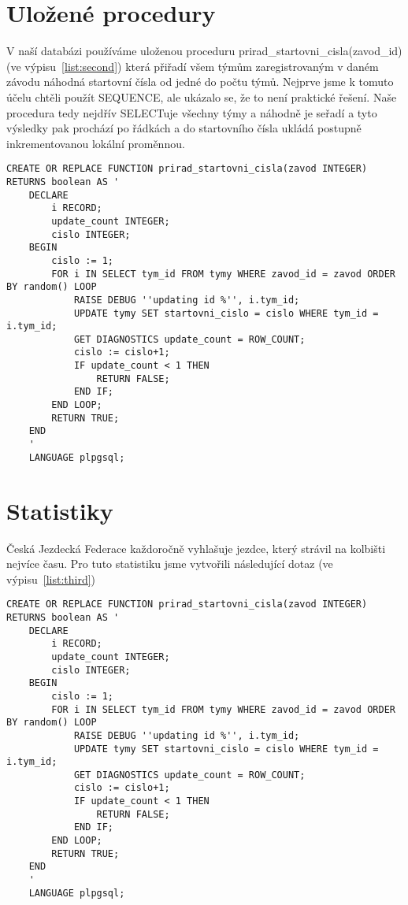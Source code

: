 \documentclass[a4paper,11pt]{article}
\theoremstyle{mytheor}
\begin{document}
\section*{Uložené procedury}
V naší databázi používáme uloženou proceduru prirad\_startovni\_cisla(zavod\_id) (ve výpisu~\ref{list:second}) která přiřadí všem týmům zaregistrovaným v daném závodu náhodná startovní čísla
od jedné do počtu týmů. Nejprve jsme k tomuto účelu chtěli použít SEQUENCE, ale ukázalo se, že to není praktické řešení. Naše procedura tedy nejdřív SELECTuje
všechny týmy a náhodně je seřadí a tyto výsledky pak prochází po řádkách a do startovního čísla ukládá postupně inkrementovanou lokální proměnnou.


\begin{lstlisting}[label={list:second},caption=Uložená procedura prirad\_startovni\_cisla\(\)]
CREATE OR REPLACE FUNCTION prirad_startovni_cisla(zavod INTEGER) RETURNS boolean AS '
	DECLARE
		i RECORD;
		update_count INTEGER;
		cislo INTEGER;
	BEGIN
		cislo := 1;
		FOR i IN SELECT tym_id FROM tymy WHERE zavod_id = zavod ORDER BY random() LOOP
			RAISE DEBUG ''updating id %'', i.tym_id;
			UPDATE tymy SET startovni_cislo = cislo WHERE tym_id = i.tym_id;
			GET DIAGNOSTICS update_count = ROW_COUNT;
			cislo := cislo+1;
			IF update_count < 1 THEN
				RETURN FALSE;
			END IF;
		END LOOP;
		RETURN TRUE;
	END
	'
	LANGUAGE plpgsql;
\end{lstlisting}

\section*{Statistiky}
Česká Jezdecká Federace každoročně vyhlašuje jezdce,
který strávil na kolbišti nejvíce času. Pro tuto statistiku jsme vytvořili následující dotaz (ve výpisu~\ref{list:third})
\begin{lstlisting}[label={list:second},caption=Uložená procedura prirad\_startovni\_cisla\(\)]
CREATE OR REPLACE FUNCTION prirad_startovni_cisla(zavod INTEGER) RETURNS boolean AS '
	DECLARE
		i RECORD;
		update_count INTEGER;
		cislo INTEGER;
	BEGIN
		cislo := 1;
		FOR i IN SELECT tym_id FROM tymy WHERE zavod_id = zavod ORDER BY random() LOOP
			RAISE DEBUG ''updating id %'', i.tym_id;
			UPDATE tymy SET startovni_cislo = cislo WHERE tym_id = i.tym_id;
			GET DIAGNOSTICS update_count = ROW_COUNT;
			cislo := cislo+1;
			IF update_count < 1 THEN
				RETURN FALSE;
			END IF;
		END LOOP;
		RETURN TRUE;
	END
	'
	LANGUAGE plpgsql;
\end{lstlisting}
\end{document}
